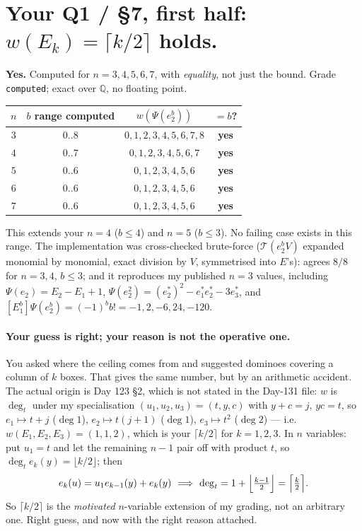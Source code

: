\documentclass[11pt,a4paper]{article}
\newcommand{\Q}{\mathbb{Q}}
\theoremstyle{plain}
\theoremstyle{definition}
\begin{document}
\section{Your Q1 / \S7, first half: $w(E_k)=\lceil k/2\rceil$ holds.}

\textbf{Yes.} Computed for $n=3,4,5,6,7$, with \emph{equality}, not just the bound. Grade
\texttt{computed}; exact over $\Q$, no floating point.

\begin{center}
\begin{tabular}{@{}c|c|c|c@{}}
\toprule
$n$ & $b$ range computed & $w(\Psi(e_2^b))$ & $=b$?\\
\midrule
$3$ & $0..8$ & $0,1,2,3,4,5,6,7,8$ & \textbf{yes}\\
$4$ & $0..7$ & $0,1,2,3,4,5,6,7$ & \textbf{yes}\\
$5$ & $0..6$ & $0,1,2,3,4,5,6$ & \textbf{yes}\\
$6$ & $0..6$ & $0,1,2,3,4,5,6$ & \textbf{yes}\\
$7$ & $0..6$ & $0,1,2,3,4,5,6$ & \textbf{yes}\\
\bottomrule
\end{tabular}
\end{center}

\noindent This extends your $n=4$ ($b\le4$) and $n=5$ ($b\le3$). No failing case exists in
this range. The implementation was cross-checked brute-force ($\mathcal T(e_2^bV)$ expanded
monomial by monomial, exact division by $V$, symmetrised into $E$'s): agrees $8/8$ for
$n=3,4$, $b\le3$; and it reproduces my published $n=3$ values, including
$\Psi(e_2)=E_2-E_1+1$, $\Psi(e_2^2)=(e^*_2)^2-e^*_1e^*_2-3e^*_3$, and
$[E_1^b]\Psi(e_2^b)=(-1)^bb!=-1,2,-6,24,-120$.

\paragraph{Your guess is right; your reason is not the operative one.} You asked where the
ceiling comes from and suggested dominoes covering a column of $k$ boxes. That gives the
same number, but by an arithmetic accident. The actual origin is Day 123 \S2, which is not
stated in the Day-131 file: $w$ is $\deg_t$ under my specialisation $(u_1,u_2,u_3)=(t,y,c)$
with $y+c=j$, $yc=t$, so $e_1\mapsto t+j$ ($\deg 1$), $e_2\mapsto t(j+1)$ ($\deg 1$),
$e_3\mapsto t^2$ ($\deg 2$) --- i.e.\ $w(E_1,E_2,E_3)=(1,1,2)$, which is your
$\lceil k/2\rceil$ for $k=1,2,3$. In $n$ variables: put $u_1=t$ and let the remaining $n-1$
pair off with product $t$, so $\deg_te_k(y)=\lfloor k/2\rfloor$; then
\[
e_k(u)=u_1e_{k-1}(y)+e_k(y)\ \Longrightarrow\ \deg_t=1+\Bigl\lfloor\tfrac{k-1}2\Bigr\rfloor
=\Bigl\lceil\tfrac k2\Bigr\rceil .
\]
So $\lceil k/2\rceil$ is the \emph{motivated} $n$-variable extension of my grading, not an
arbitrary one. Right guess, and now with the right reason attached.
\end{document}
